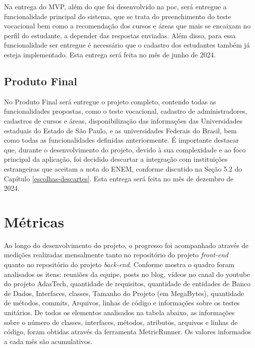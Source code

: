 Na entrega do MVP, além do que foi desenvolvido na \ac{poc}, será entregue a funcionalidade principal do sistema, que se trata do preenchimento do teste vocacional  bem como a recomendação dos cursos e áreas que mais se encaixam no perfil do estudante, a depender das respostas enviadas. Além disso, para essa funcionalidade ser entregue é necessário que o cadastro dos estudantes também já esteja implementado. Esta entrega será feita no mês de junho de 2024.


\subsection{Produto Final}

No Produto Final será entregue o projeto completo, contendo todas as funcionalidades propostas, como o teste vocacional, cadastro de administradores, cadastros de cursos e áreas, disponibilização das informações das Universidades estaduais do Estado de São Paulo, e as universidades Federais do Brasil, bem como todas as funcionalidades definidas anteriormente. É importante destacar que, durante o desenvolvimento do projeto, devido à sua complexidade e ao foco principal da aplicação, foi decidido descartar a integração com instituições estrangeiras que aceitam a nota do ENEM, conforme discutido na Seção 5.2 do Capítulo \ref{escolhas-descartes}. Esta entrega será feita no mês de dezembro de 2024.



\newpage

\section{Métricas}

Ao longo do desenvolvimento do projeto, o progresso foi acompanhado através de medições realizadas mensalmente tanto no repositório do projeto \textit{front-end} quanto no repositório do projeto \textit{back-end}. Conforme mostra o quadro foram analisados os itens: reuniões da equipe, posts no blog, vídeos no canal do youtube do projeto AdasTech, quantidade de requisitos, quantidade de entidades de Banco de Dados, Interfaces, classes, Tamanho do Projeto (em MegaBytes), quantidade de métodos, commits, Arquivos, linhas de código e informações sobre os testes unitários. De todos os elementos analisados na tabela abaixo, as informações sobre o número de classes, interfaces, métodos, atributos, arquivos e linhas de código, foram obtidas através da ferramenta MetricRunner. Os valores informados a cada mês são acumulativos.


